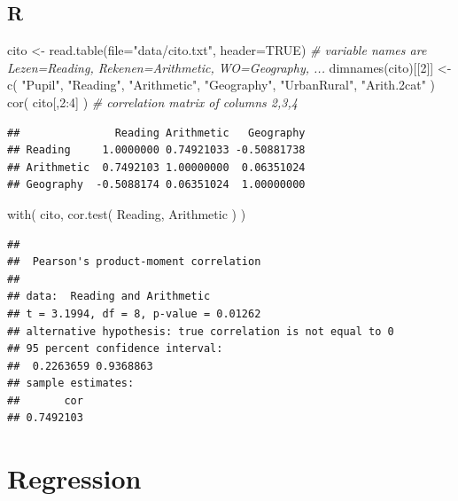 \documentclass[
]{book}
\newenvironment{Shaded}{\begin{snugshade}}{\end{snugshade}}
\newcommand{\AttributeTok}[1]{\textcolor[rgb]{0.77,0.63,0.00}{#1}}
\newcommand{\CommentTok}[1]{\textcolor[rgb]{0.56,0.35,0.01}{\textit{#1}}}
\newcommand{\ConstantTok}[1]{\textcolor[rgb]{0.00,0.00,0.00}{#1}}
\newcommand{\DecValTok}[1]{\textcolor[rgb]{0.00,0.00,0.81}{#1}}
\newcommand{\FunctionTok}[1]{\textcolor[rgb]{0.00,0.00,0.00}{#1}}
\newcommand{\NormalTok}[1]{#1}
\newcommand{\OtherTok}[1]{\textcolor[rgb]{0.56,0.35,0.01}{#1}}
\newcommand{\SpecialCharTok}[1]{\textcolor[rgb]{0.00,0.00,0.00}{#1}}
\newcommand{\StringTok}[1]{\textcolor[rgb]{0.31,0.60,0.02}{#1}}
\begin{document}
\hypertarget{r-7}{%
\subsection{R}\label{r-7}}

\begin{Shaded}
\begin{Highlighting}[]
\NormalTok{cito }\OtherTok{\textless{}{-}} \FunctionTok{read.table}\NormalTok{(}\AttributeTok{file=}\StringTok{"data/cito.txt"}\NormalTok{, }\AttributeTok{header=}\ConstantTok{TRUE}\NormalTok{)}
\CommentTok{\# variable names are Lezen=Reading, Rekenen=Arithmetic, WO=Geography, ...}
\FunctionTok{dimnames}\NormalTok{(cito)[[}\DecValTok{2}\NormalTok{]] }\OtherTok{\textless{}{-}} \FunctionTok{c}\NormalTok{( }\StringTok{"Pupil"}\NormalTok{, }\StringTok{"Reading"}\NormalTok{, }\StringTok{"Arithmetic"}\NormalTok{, }\StringTok{"Geography"}\NormalTok{,}
                          \StringTok{"UrbanRural"}\NormalTok{, }\StringTok{"Arith.2cat"}\NormalTok{ )}
\FunctionTok{cor}\NormalTok{( cito[,}\DecValTok{2}\SpecialCharTok{:}\DecValTok{4}\NormalTok{] ) }\CommentTok{\# correlation matrix of columns 2,3,4}
\end{Highlighting}
\end{Shaded}

\begin{verbatim}
##               Reading Arithmetic   Geography
## Reading     1.0000000 0.74921033 -0.50881738
## Arithmetic  0.7492103 1.00000000  0.06351024
## Geography  -0.5088174 0.06351024  1.00000000
\end{verbatim}

\begin{Shaded}
\begin{Highlighting}[]
\FunctionTok{with}\NormalTok{( cito, }\FunctionTok{cor.test}\NormalTok{( Reading, Arithmetic ) )}
\end{Highlighting}
\end{Shaded}

\begin{verbatim}
## 
##  Pearson's product-moment correlation
## 
## data:  Reading and Arithmetic
## t = 3.1994, df = 8, p-value = 0.01262
## alternative hypothesis: true correlation is not equal to 0
## 95 percent confidence interval:
##  0.2263659 0.9368863
## sample estimates:
##       cor 
## 0.7492103
\end{verbatim}

\hypertarget{sec:regression}{%
\section{Regression}\label{sec:regression}}
\end{document}
